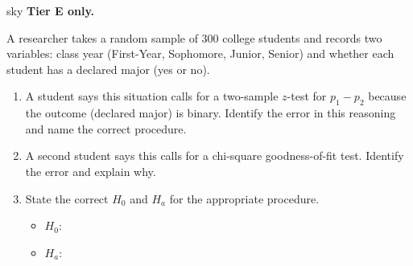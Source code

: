 \documentclass[10pt]{article}
\begin{document}
\begin{scenariobox}{sky}
\textbf{Tier E only.}

A researcher takes a random sample of 300 college students and records two variables: class
year (First-Year, Sophomore, Junior, Senior) and whether each student has a declared major
(yes or no).

\begin{enumerate}
  \item A student says this situation calls for a two-sample $z$-test for $p_1 - p_2$
        because the outcome (declared major) is binary. Identify the error in this reasoning
        and name the correct procedure.
        \ansline{}  \ansline{}
  \item A second student says this calls for a chi-square goodness-of-fit test. Identify the
        error and explain why.
        \ansline{}  \ansline{}
  \item State the correct $H_0$ and $H_a$ for the appropriate procedure.
        \begin{itemize}
          \item $H_0$: 
          \item $H_a$: 
        \end{itemize}
\end{enumerate}
\end{scenariobox}
\end{document}
